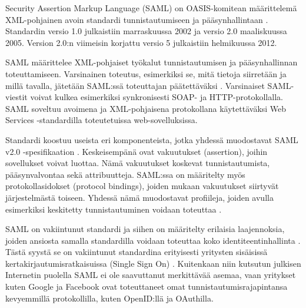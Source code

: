 Security Assertion Markup Language (SAML) on OASIS-komitean määrittelemä XML-pohjainen avoin standardi tunnistautumiseen ja pääsynhallintaan \cite{saml_spec}. Standardin versio 1.0 julkaistiin marraskuussa 2002 ja versio 2.0 maaliskuussa 2005. Version 2.0:n viimeisin korjattu versio 5 julkaistiin helmikuussa 2012.

SAML määrittelee XML-pohjaiset työkalut tunnistautumisen ja pääsynhallinnan toteuttamiseen. Varsinainen toteutus, esimerkiksi se, mitä tietoja siirretään ja millä tavalla, jätetään SAML:ssä toteuttajan päätettäväksi \cite{dynamic_saml}. Varsinaiset SAML-viestit voivat kulkea esimerkiksi synkronisesti SOAP- ja HTTP-protokollalla. SAML soveltuu avoimena ja XML-pohjaisena protokollana käytettäväksi Web Services -standardilla toteutetuissa web-sovelluksissa.

Standardi koostuu useista eri komponenteista, jotka yhdessä muodostavat SAML v2.0 -spesifikaation \cite{saml_spec}. Keskeisempänä ovat vakuutukset (assertion), joihin sovellukset voivat luottaa. Nämä vakuutukset koskevat tunnistautumista, pääsynvalvontaa sekä attribuutteja. SAML:ssa on määritelty myös protokollasidokset (protocol bindings), joiden mukaan vakuutukset siirtyvät järjestelmästä toiseen. Yhdessä nämä muodostavat profiileja, joiden avulla esimerkiksi keskitetty tunnistautuminen voidaan toteuttaa \cite{saml_spec}.

SAML on vakiintunut standardi ja siihen on määritelty erilaisia laajennoksia, joiden ansiosta samalla standardilla voidaan toteuttaa koko identiteentinhallinta \cite{saml_spec}. Tästä syystä se on vakiintunut standardina erityisesti yritysten sisäisissä kertakirjautumisratkaisuissa (Single Sign On) \cite{dynamic_saml}. Kuitenkaan niin kutsutun julkisen Internetin puolella SAML ei ole saavuttanut merkittävää asemaa, vaan yritykset kuten Google ja Facebook ovat toteuttaneet omat tunnistautumisrajapintansa kevyemmillä protokollilla, kuten OpenID:llä ja OAuthilla.